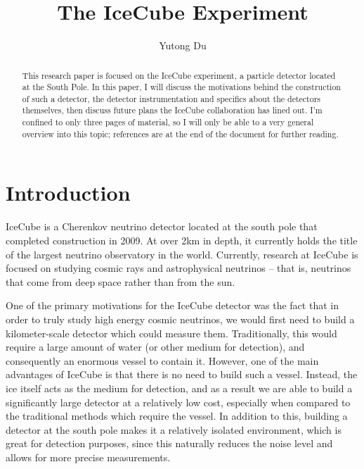 \documentclass[11pt]{article}
\title{\bf The IceCube Experiment}
\author{Yutong Du}
\date{\vspace{2px} \hrule \vspace{-0.2in}}
\begin{document}
\maketitle

\begin{abstract}
    \noindent This research paper is focused on the IceCube experiment, a particle detector located 
    at the South Pole. In this paper, I will discuss the motivations behind the 
    construction of such a detector, the detector instrumentation and specifics about 
    the detectors themselves, then discuss future plans the IceCube collaboration 
    has lined out. I'm confined to only three pages of material, so I will only 
    be able to a very general overview into this topic; references are at the end 
    of the document for further reading.
\end{abstract}
    \section{Introduction}
    IceCube is a Cherenkov neutrino detector located at the south pole that completed 
    construction in 2009. At over 2km in depth, it currently holds the title of the 
    largest neutrino observatory in the world. Currently, research at IceCube is focused
    on studying cosmic rays and astrophysical neutrinos -- that is, neutrinos that come from deep
    space rather than from the sun.

    One of the primary motivations for the IceCube detector was the fact that in order to 
    truly study high energy cosmic neutrinos, we would first need to build a kilometer-scale 
    detector which could measure them. Traditionally, this would require a large
    amount of water (or other medium for detection), and consequently an enormous vessel
    to contain it. However, one of the main advantages of IceCube is that there is no 
    need to build such a vessel. Instead, the ice itself acts as the medium for 
    detection, and as a result we are able to build a significantly large detector at a 
    relatively low cost, especially when compared to the traditional methods which require the vessel. In addition to this, building 
    a detector at the south pole makes it a relatively isolated environment, which is 
    great for detection purposes, since this naturally reduces the noise level and allows
    for more precise measurements.
\end{document}
